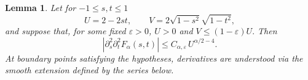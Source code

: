 \documentclass[11pt]{amsart}
\newtheorem{lemma}[theorem]{Lemma}
\begin{document}


\begin{lemma}
\label{lem:separated-derivative}
Let for $-1\le s,t\le 1$
$$U=2-2st,\qquad V=2\sqrt{1-s^2}\sqrt{1-t^2},$$
and suppose that, for some fixed $\varepsilon>0$,
$U>0$ and
$V\le (1-\varepsilon)U.$ Then
\begin{equation}
\label{eq:separated-derivative}
\left|
\partial_s^2\partial_t^2F_\alpha(s,t)
\right|
\le
C_{\alpha,\varepsilon}\,
U^{\alpha/2-4}.
\end{equation}
At boundary points satisfying the hypotheses, derivatives are
understood via the smooth extension defined by the series below.
\end{lemma}
\end{document}
